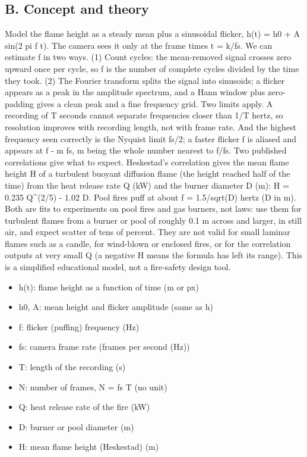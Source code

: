 \documentclass[11pt,a4paper]{article}
\begin{document}
\subsection*{B. Concept and theory}
Model the flame height as a steady mean plus a sinusoidal flicker, h(t) = h0 + A sin(2 pi f t). The camera sees it only at the frame times t = k/fs. We can estimate f in two ways. (1) Count cycles: the mean-removed signal crosses zero upward once per cycle, so f is the number of complete cycles divided by the time they took. (2) The Fourier transform splits the signal into sinusoids; a flicker appears as a peak in the amplitude spectrum, and a Hann window plus zero-padding gives a clean peak and a fine frequency grid. Two limits apply. A recording of T seconds cannot separate frequencies closer than 1/T hertz, so resolution improves with recording length, not with frame rate. And the highest frequency seen correctly is the Nyquist limit fs/2; a faster flicker f is aliased and appears at \textbar{}f - m fs\textbar{}, m being the whole number nearest to f/fs. Two published correlations give what to expect. Heskestad's correlation gives the mean flame height H of a turbulent buoyant diffusion flame (the height reached half of the time) from the heat release rate Q (kW) and the burner diameter D (m): H = 0.235 Q\textasciicircum{}(2/5) - 1.02 D. Pool fires puff at about f = 1.5/sqrt(D) hertz (D in m). Both are fits to experiments on pool fires and gas burners, not laws: use them for turbulent flames from a burner or pool of roughly 0.1 m across and larger, in still air, and expect scatter of tens of percent. They are not valid for small laminar flames such as a candle, for wind-blown or enclosed fires, or for the correlation outputs at very small Q (a negative H means the formula has left its range). This is a simplified educational model, not a fire-safety design tool.

\begin{itemize}[nosep]
\item h(t): flame height as a function of time (m or px)
\item h0, A: mean height and flicker amplitude (same as h)
\item f: flicker (puffing) frequency (Hz)
\item fs: camera frame rate (frames per second (Hz))
\item T: length of the recording (s)
\item N: number of frames, N = fs T (no unit)
\item Q: heat release rate of the fire (kW)
\item D: burner or pool diameter (m)
\item H: mean flame height (Heskestad) (m)
\end{itemize}
\end{document}
